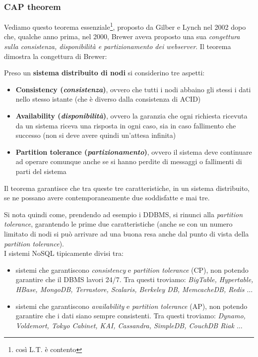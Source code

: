 \documentclass[a4paper,12pt, oneside]{book}
\begin{document}
\subsubsection{CAP theorem}
Vediamo questo teorema essenziale\footnote{così L.T. è contento}, proposto da
Gilber e Lynch nel 2002 dopo che, qualche anno prima, nel 2000, Brewer aveva
proposto una sua \textit{congettura sulla consistenza, disponibilità e
  partizionamento dei webserver}. Il teorema dimostra la congettura di Brewer:
\begin{teorema}
  Preso un \textbf{sistema distribuito di nodi} si considerino tre aspetti:
  \begin{itemize}
    \item \textbf{Consistency (\textit{consistenza})}, ovvero che tutti i nodi
    abbaino gli stessi i dati nello stesso istante (che è diverso dalla
    consistenza di ACID)
    \item \textbf{Availability (\textit{disponibilità})}, ovvero la garanzia che
    ogni richiesta ricevuta da un sistema riceva una risposta in
    ogni caso, sia in caso fallimento che successo (non si deve avere quindi
    un'attesa infinita)
    \item \textbf{Partition tolerance (\textit{partizionamento})}, ovvero il
    sistema deve continuare ad operare comunque anche se si hanno perdite di
    messaggi o fallimenti di parti del sistema
  \end{itemize}
  Il teorema garantisce che tra queste tre caratteristiche, in un sistema
  distribuito, se ne possano avere contemporaneamente due soddisfatte e mai tre.
\end{teorema}
Si nota quindi come, prendendo ad esempio i DDBMS, si rinunci alla
\textit{partition tolerance}, garantendo le prime due caratteristiche (anche se
con un numero limitato di nodi si può arrivare ad una buona resa anche dal
punto di vista della \textit{partition tolerance}).\\
I sistemi NoSQL tipicamente divisi tra:
\begin{itemize}
  \item sistemi che garantiscono \textit{consistency} e \textit{partition
    tolerance} (CP), non potendo garantire che il DBMS lavori 24/7. Tra questi
  troviamo:
  \textit{BigTable, Hypertable, HBase, MongoDB, Terrastore, Scalaris, Berkeley
    DB, MemcacheDB, Redis $\ldots$}
  \item sistemi che garantiscono \textit{availability} e \textit{partition
    tolerance} (AP), non potendo garantire che i dati siano sempre
  consistenti. Tra questi troviamo: \textit{Dynamo, Voldemort, Tokyo Cabinet,
    KAI, Cassandra, SimpleDB, CouchDB Riak $\ldots$}
\end{itemize}
\end{document}
